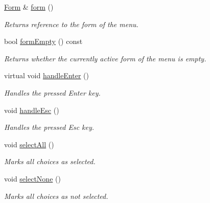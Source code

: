 \begin{DoxyCompactItemize}
\hyperlink{structslb_1_1core_1_1ui_1_1Form}{Form} \& \hyperlink{structslb_1_1core_1_1ui_1_1MenuBase_a2d095f7166ad46154af046d34bd77cd3}{form} ()
\begin{DoxyCompactList}\small\item\em Returns reference to the form of the menu. \end{DoxyCompactList}\item 
bool \hyperlink{structslb_1_1core_1_1ui_1_1MenuBase_ad6eeca2af6428b85c933547bc5c8715a}{form\+Empty} () const 
\begin{DoxyCompactList}\small\item\em Returns whether the currently active form of the menu is empty. \end{DoxyCompactList}\item 
virtual void \hyperlink{structslb_1_1core_1_1ui_1_1MenuBase_af6a38ec85013523f3d6fb229cbfb0aaa}{handle\+Enter} ()\hypertarget{structslb_1_1core_1_1ui_1_1MenuBase_af6a38ec85013523f3d6fb229cbfb0aaa}{}\label{structslb_1_1core_1_1ui_1_1MenuBase_af6a38ec85013523f3d6fb229cbfb0aaa}

\begin{DoxyCompactList}\small\item\em Handles the pressed Enter key. \end{DoxyCompactList}\item 
void \hyperlink{structslb_1_1core_1_1ui_1_1MenuBase_a25f675493c97de233c6a2a21a78c5f98}{handle\+Esc} ()\hypertarget{structslb_1_1core_1_1ui_1_1MenuBase_a25f675493c97de233c6a2a21a78c5f98}{}\label{structslb_1_1core_1_1ui_1_1MenuBase_a25f675493c97de233c6a2a21a78c5f98}

\begin{DoxyCompactList}\small\item\em Handles the pressed Esc key. \end{DoxyCompactList}\item 
void \hyperlink{structslb_1_1core_1_1ui_1_1MenuBase_ac4aa4af84582448f17fc11d51952624a}{select\+All} ()\hypertarget{structslb_1_1core_1_1ui_1_1MenuBase_ac4aa4af84582448f17fc11d51952624a}{}\label{structslb_1_1core_1_1ui_1_1MenuBase_ac4aa4af84582448f17fc11d51952624a}

\begin{DoxyCompactList}\small\item\em Marks all choices as selected. \end{DoxyCompactList}\item 
void \hyperlink{structslb_1_1core_1_1ui_1_1MenuBase_ac7e814989c029927a266b5fedfb09c11}{select\+None} ()\hypertarget{structslb_1_1core_1_1ui_1_1MenuBase_ac7e814989c029927a266b5fedfb09c11}{}\label{structslb_1_1core_1_1ui_1_1MenuBase_ac7e814989c029927a266b5fedfb09c11}

\begin{DoxyCompactList}\small\item\em Marks all choices as not selected. \end{DoxyCompactList}\end{DoxyCompactItemize}
